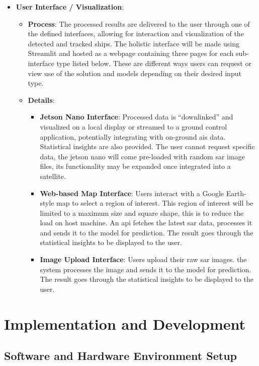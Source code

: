 \documentclass{article}
\begin{document}
\begin{itemize}
\begin{itemize}
    \end{itemize}
    \item \textbf{User Interface / Visualization}:
    \begin{itemize}
        \item \textbf{Process}: The processed results are delivered to the user through one of the defined interfaces, allowing for interaction and visualization of the detected and tracked ships. The holistic interface will be made using Streamlit and hosted as a webpage containing three pages for each sub-interface type listed below. These are different ways users can request or view use of the solution and models depending on their desired input type. \item \textbf{Details}:
        \begin{itemize}
            \item \textbf{Jetson Nano Interface}: Processed data is “downlinked” and visualized on a local display or streamed to a ground control application, potentially integrating with on-ground \acrshort{ais} data. Statistical insights are also provided. The user cannot request specific data, the jetson nano will come pre-loaded with random \acrshort{sar} image files, its functionality may be expanded once integrated into a satellite. \item \textbf{Web-based Map Interface}: Users interact with a Google Earth-style map to select a region of interest. This region of interest will be limited to a maximum size and square shape, this is to reduce the load on host machine. An \acrshort{api} fetches the latest \acrshort{sar} data, processes it and sends it to the model for prediction. The result goes through the statistical insights to be displayed to the user. \item \textbf{Image Upload Interface}: Users upload their raw \acrshort{sar} images. the system processes the image and sends it to the model for prediction. The result goes through the statistical insights to be displayed to the user. \end{itemize}
    \end{itemize}
\end{itemize}


\newpage
\section{Implementation and Development}
\subsection{Software and Hardware Environment Setup}
\end{document}
